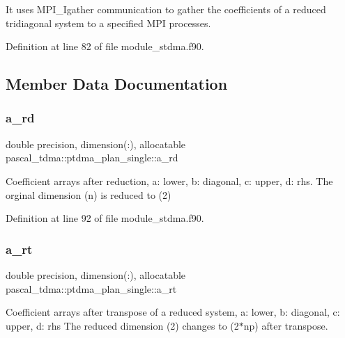 It uses M\+P\+I\+\_\+\+Igather communication to gather the coefficients of a reduced tridiagonal system to a specified M\+PI processes. 

Definition at line 82 of file module\+\_\+stdma.\+f90.



\subsection{Member Data Documentation}
\mbox{\label{structpascal__tdma_1_1ptdma__plan__single_a732d93dcbef429c1396a6f7ace9cefa6}} 
\subsubsection{\texorpdfstring{a\_rd}{a\_rd}}
{\footnotesize\ttfamily double precision, dimension(\+:), allocatable pascal\+\_\+tdma\+::ptdma\+\_\+plan\+\_\+single\+::a\+\_\+rd}



Coefficient arrays after reduction, a\+: lower, b\+: diagonal, c\+: upper, d\+: rhs. The orginal dimension (n) is reduced to (2) 



Definition at line 92 of file module\+\_\+stdma.\+f90.

\mbox{\label{structpascal__tdma_1_1ptdma__plan__single_ad8bed95f594c23d7df9467e204025a74}} 
\subsubsection{\texorpdfstring{a\_rt}{a\_rt}}
{\footnotesize\ttfamily double precision, dimension(\+:), allocatable pascal\+\_\+tdma\+::ptdma\+\_\+plan\+\_\+single\+::a\+\_\+rt}



Coefficient arrays after transpose of a reduced system, a\+: lower, b\+: diagonal, c\+: upper, d\+: rhs The reduced dimension (2) changes to (2$\ast$np) after transpose. 



